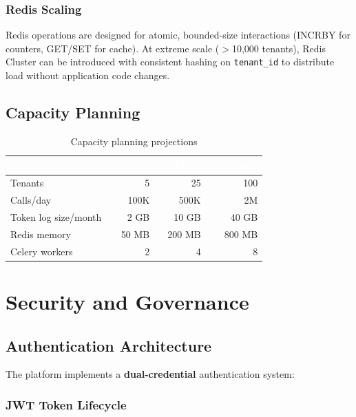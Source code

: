 \documentclass[12pt,a4paper,twoside]{report}
\begin{document}
\subsection{Redis Scaling}

Redis operations are designed for atomic, bounded-size interactions (INCRBY for counters, GET/SET for cache). At extreme scale ($>$10,000 tenants), Redis Cluster can be introduced with consistent hashing on \texttt{tenant\_id} to distribute load without application code changes.

\section{Capacity Planning}

\begin{table}[H]
\centering
\begin{tabularx}{\textwidth}{|l|r|r|r|}
\hline
\rowcolor{tabheader}
\textcolor{white}{\textbf{Metric}} &
\textcolor{white}{\textbf{Current}} &
\textcolor{white}{\textbf{6-Month}} &
\textcolor{white}{\textbf{12-Month}} \\
\hline
Tenants & 5 & 25 & 100 \\
\hline
Calls/day & 100K & 500K & 2M \\
\hline
Token log size/month & 2 GB & 10 GB & 40 GB \\
\hline
Redis memory & 50 MB & 200 MB & 800 MB \\
\hline
Celery workers & 2 & 4 & 8 \\
\hline
\end{tabularx}
\caption{Capacity planning projections}
\end{table}



\chapter{Security and Governance}

\section{Authentication Architecture}

The platform implements a \textbf{dual-credential} authentication system:

\subsection{JWT Token Lifecycle}
\end{document}
